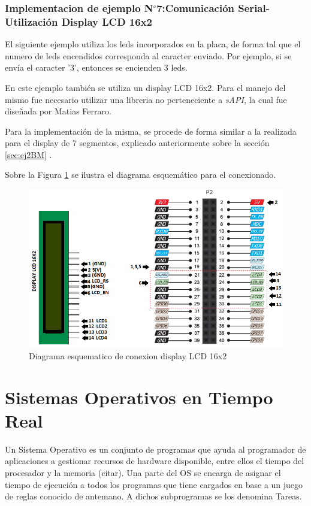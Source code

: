 \documentclass[12pt,letterpaper]{article}
\begin{document}
\subsubsection{Implementacion de ejemplo N$^{\circ}$7:Comunicación Serial-Utilización Display LCD 16x2}
El siguiente ejemplo utiliza los leds incorporados en la placa, de forma tal que el numero de leds encendidos corresponda al caracter enviado. Por ejemplo, si se envía el caracter '3', entonces se encienden 3 leds.

En este ejemplo también se utiliza un display LCD 16x2. Para el manejo del mismo fue necesario utilizar una libreria no perteneciente a \textit{sAPI}, la cual fue diseñada por Matias Ferraro\cite{repositoriomatiasferraro}.

Para la implementación de la misma, se procede de forma similar a la realizada para el display de 7 segmentos, explicado anteriormente sobre la sección \ref{sec:ej2BM} .

Sobre la Figura \ref{Fig31} se ilustra el diagrama esquemático para el conexionado.

\begin{center}
\begin{figure}[!h]
\centering
\includegraphics[width=8 cm]{figuras/f13.png}
\caption{Diagrama esquematico de conexion display LCD 16x2}
\label{Fig31}
\end{figure}
\end{center}

\section{Sistemas Operativos en Tiempo Real}
Un Sistema Operativo es un conjunto de programas que ayuda al programador de aplicaciones a gestionar recursos de hardware disponible, entre ellos el tiempo del procesador y la memoria (citar).
Una parte del OS se encarga de asignar el tiempo de ejecución a todos los programas que tiene cargados en base a un juego de reglas conocido de antemano. A dichos subprogramas se los denomina Tareas.
\end{document}
